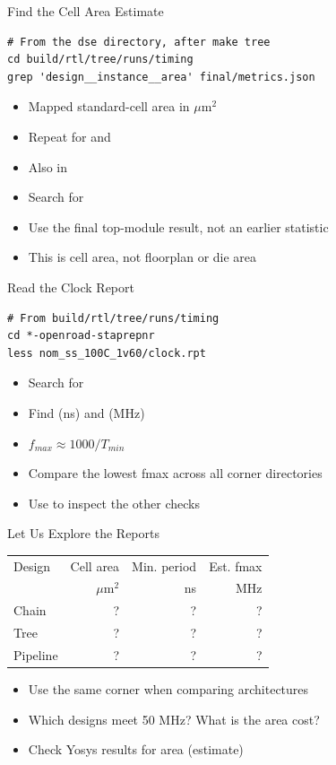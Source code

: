 \begin{frame}[fragile]{Find the Cell Area Estimate}
\begin{lstlisting}[language={}]
# From the dse directory, after make tree
cd build/rtl/tree/runs/timing
grep 'design__instance__area' final/metrics.json
\end{lstlisting}
\begin{itemize}
\item Mapped standard-cell area in $\mu$m$^2$
\item Repeat for  and 
\item Also in 
\item Search for 
\item Use the final top-module result, not an earlier statistic
\item This is cell area, not floorplan or die area
\end{itemize}
\end{frame}

\begin{frame}[fragile]{Read the Clock Report}
\begin{lstlisting}[language={}]
# From build/rtl/tree/runs/timing
cd *-openroad-staprepnr
less nom_ss_100C_1v60/clock.rpt
\end{lstlisting}
\begin{itemize}
\item Search for 
\item Find  (ns) and  (MHz)
\item $f_{max} \approx 1000 / T_{min}$
\item Compare the lowest fmax across all corner directories
\item Use  to inspect the other checks
\end{itemize}
\end{frame}

\begin{frame}{Let Us Explore the Reports}
\begin{center}
\begin{tabular}{lrrr}
\toprule
Design & Cell area & Min. period & Est. fmax\\
 & $\mu$m$^2$ & ns & MHz\\
\midrule
Chain & ? & ? & ?\\[1ex]
Tree & ? & ? & ?\\[1ex]
Pipeline & ? & ? & ?\\
\bottomrule
\end{tabular}
\end{center}
\begin{itemize}
\item Use the same corner when comparing architectures
\item Which designs meet 50 MHz? What is the area cost?
\item Check Yosys results for area (estimate)
\end{itemize}
\end{frame}

